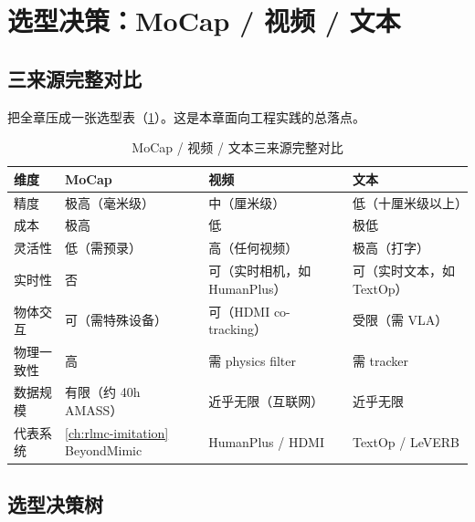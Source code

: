 \section{选型决策：MoCap / 视频 / 文本}
\label{sec:rlmc-mm-choose}

\subsection{三来源完整对比}
\label{sec:rlmc-mm-choose-compare}

把全章压成一张选型表（\cref{tab:rlmc-mm-choose}）。这是本章面向工程实践的总落点。

\begin{table}[ht]
\centering
\small
\caption{MoCap / 视频 / 文本三来源完整对比}
\label{tab:rlmc-mm-choose}
\begin{tabular}{@{}llll@{}}
\toprule
维度 & MoCap & 视频 & 文本 \\
\midrule
精度 & 极高（毫米级） & 中（厘米级） & 低（十厘米级以上） \\
成本 & 极高 & 低 & 极低 \\
灵活性 & 低（需预录） & 高（任何视频） & 极高（打字） \\
实时性 & 否 & 可（实时相机，如 HumanPlus） & 可（实时文本，如 TextOp） \\
物体交互 & 可（需特殊设备） & 可（HDMI co-tracking） & 受限（需 VLA） \\
物理一致性 & 高 & 需 physics filter & 需 tracker \\
数据规模 & 有限（约 40h AMASS） & 近乎无限（互联网） & 近乎无限 \\
代表系统 & \cref{ch:rlmc-imitation} BeyondMimic & HumanPlus / HDMI & TextOp / LeVERB \\
\bottomrule
\end{tabular}
\end{table}

\subsection{选型决策树}
\label{sec:rlmc-mm-choose-tree}

